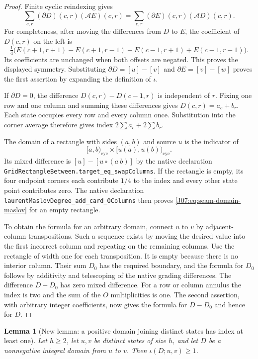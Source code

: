 \documentclass[11pt,oneside]{report}
\newtheorem{lemma}[theorem]{Lemma}
\theoremstyle{definition}
\numberwithin{equation}{section}
\newcommand{\decl}[1]{\textnormal{\nolinkurl{#1}}}
\begin{document}
\begin{proof}
Finite cyclic reindexing gives
\[
 \sum_{c,r}(\partial D)(c,r)(\mathcal A E)(c,r)
 =\sum_{c,r}(\partial E)(c,r)(\mathcal A D)(c,r).
\]
For completeness, after moving the differences from $D$ to $E$, the
coefficient of $D(c,r)$ on the left is
\[
 \tfrac14\bigl(E(c+1,r+1)-E(c+1,r-1)
             -E(c-1,r+1)+E(c-1,r-1)\bigr).
\]
Its coefficients are unchanged when both offsets are negated. This
proves the displayed symmetry. Substituting
$\partial D=[u]-[v]$ and $\partial E=[v]-[w]$ proves the first assertion
by expanding the definition of $\iota$.

If $\partial D=0$, the difference $D(c,r)-D(c-1,r)$ is independent
of $r$. Fixing one row and one column and summing these differences
gives $D(c,r)=a_c+b_r$. Each state occupies every row and every column
once. Substitution into the corner average therefore gives index
$2\sum a_c+2\sum b_r$.

The domain of a rectangle with sides $(a,b)$ and source $u$ is the
indicator of
\[
 [a,b)_{\mathrm{cyc}}\times[u(a),u(b))_{\mathrm{cyc}}.
\]
Its mixed difference is $[u]-[u\circ(a\ b)]$ by the native declaration
\decl{GridRectangleBetween.target_eq_swapColumns}.
If the rectangle is empty, its four endpoint corners each contribute
$1/4$ to the index and every other state point contributes zero.
The native declaration \decl{laurentMaslovDegree_add_card_OColumns}
then proves \eqref{J07:eq:seam-domain-maslov} for an empty rectangle.

To obtain the formula for an arbitrary domain, connect $u$ to $v$ by
adjacent-column transpositions. Such a sequence exists by moving the
desired value into the first incorrect column and repeating on the
remaining columns. Use the rectangle of width one for each transposition.
It is empty because there is no interior column. Their sum $D_0$ has
the required boundary, and the formula for $D_0$ follows by additivity
and telescoping of the native grading differences. The difference
$D-D_0$ has zero mixed difference. For a row or column annulus the
index is two and the sum of the $O$ multiplicities is one.
The second assertion, with arbitrary integer coefficients, now gives
the formula for $D-D_0$ and hence for $D$.
\end{proof}

\begin{lemma}[New lemma: a positive domain joining distinct states has index at least one]
\label{J07:lem:seam-positive-index-lower-bound}
Let $h\ge2$, let $u,v$ be distinct states of size $h$, and let $D$
be a nonnegative integral domain from $u$ to $v$.
Then $\iota(D;u,v)\ge1$.
\end{lemma}
\end{document}
